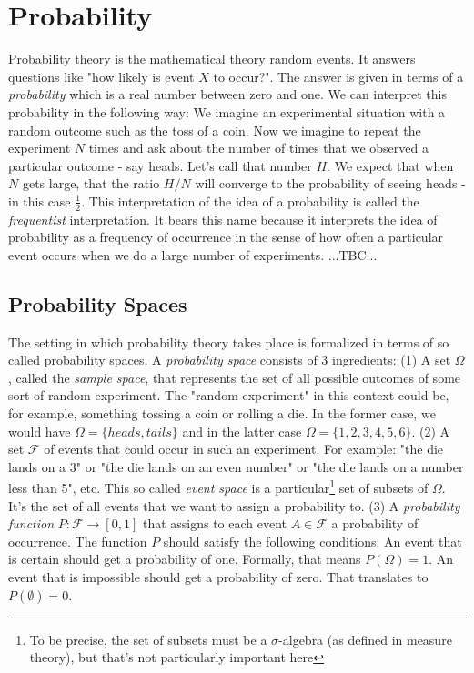 \section{Probability}
Probability theory is the mathematical theory random events. It answers questions like "how likely is event $X$ to occur?". The answer is given in terms of a \emph{probability} which is a real number between zero and one. We can interpret this probability in the following way: We imagine an experimental situation with a random outcome such as the toss of a coin. Now we imagine to repeat the experiment $N$ times and ask about the number of times that we observed a particular outcome - say heads. Let's call that number $H$. We expect that when $N$ gets large, that the ratio $H/N$ will converge to the probability of seeing heads - in this case $\frac{1}{2}$. This interpretation of the idea of a probability is called the \emph{frequentist} interpretation. It bears this name because it interprets the idea of probability as a frequency of occurrence in the sense of how often a particular event occurs when we do a large number of experiments.  ...TBC...

\subsection{Probability Spaces}
The setting in which probability theory takes place is formalized in terms of so called probability spaces. A \emph{probability space} consists of 3 ingredients: (1) A set $\Omega$, called the \emph{sample space}, that represents the set of all possible outcomes of some sort of random experiment. The "random experiment" in this context could be, for example, something tossing a coin or rolling a die. In the former case, we would have $\Omega = \{heads, tails\}$ and in the latter case $\Omega = \{1,2,3,4,5,6\}$. (2) A set $\mathcal{F}$ of events that could occur in such an experiment. For example: "the die lands on a 3" or "the die lands on an even number" or "the die lands on a number less than 5", etc. This so called \emph{event space} is a particular\footnote{To be precise, the set of subsets must be a $\sigma$-algebra (as defined in measure theory), but that's not particularly important here} set of subsets of $\Omega$. It's the set of all events that we want to assign a probability to. (3) A \emph{probability function} $P: \mathcal{F} \rightarrow [0,1]$ that assigns to each event $A \in \mathcal{F}$ a probability of occurrence. The function $P$ should satisfy the following conditions: An event that is certain should get a probability of one. Formally, that means $P(\Omega) = 1$. An event that is impossible should get a probability of zero. That translates to $P(\emptyset) = 0$.

